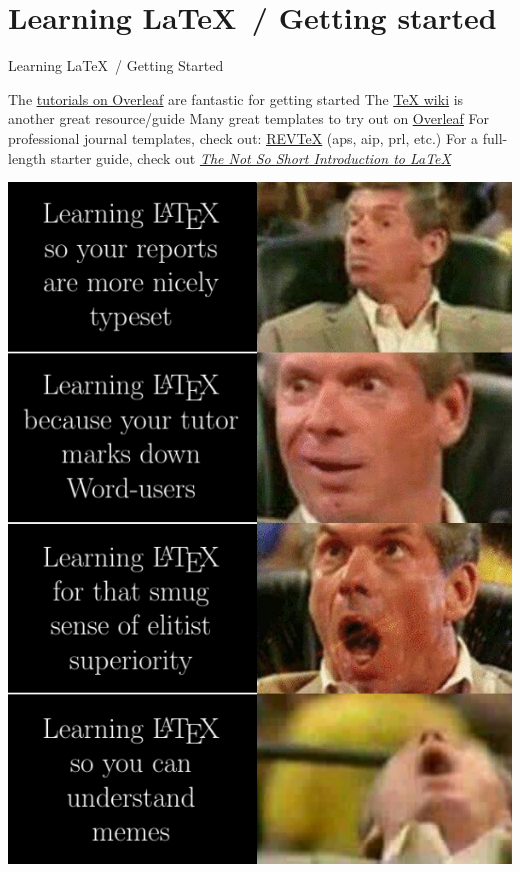 \documentclass[10pt]{beamer}
\begin{document}
\section{Learning \LaTeX\, / Getting started}
\begin{frame}{Learning \LaTeX\, / Getting Started}

\begin{minipage}{0.5\textwidth}
\bi The \href{https://www.overleaf.com/learn}{\underline{tutorials on Overleaf}} are fantastic for getting started \ei
\bi The \href{https://en.wikibooks.org/wiki/LaTeX/}{\underline{TeX wiki}} is another great resource/guide \ei
\bi Many great templates to try out on \href{https://www.overleaf.com/latex/templates/}{\underline{Overleaf}}
\bi For professional journal templates, check out: \href{https://journals.aps.org/revtex}{\underline{REVTeX}} (aps, aip, prl, etc.) \ei \ei
\bi For a full-length starter guide, check out \textit{\href{https://tobi.oetiker.ch/lshort/lshort-letter.pdf}{The Not So Short Introduction to \LaTeX}}\, \cite{notsoshort} \ei
\end{minipage}
\hfill
\begin{minipage}{.45\textwidth}
\includegraphics[width=\textwidth]{./figures/learnlatex.png} %
\end{minipage}
\end{frame}
\end{document}
